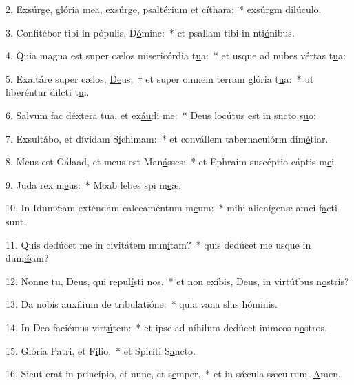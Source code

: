 2. Exsúrge, glória mea, exsúrge, psaltérium et c\uline{í}thara:~* exsúrgm dil\uline{ú}culo.\par 
3. Confitébor tibi in pópulis, D\uline{ó}mine:~* et psallam tibi in nti\uline{ó}nibus.\par 
4. Quia magna est super cælos misericórdia t\uline{u}a:~* et usque ad nubes vértas t\uline{u}a:\par 
5. Exaltáre super cælos, \uline{De}us,~† et super omnem terram glória t\uline{u}a:~* ut liberéntur dilcti t\uline{u}i.\par 
6. Salvum fac déxtera tua, et ex\uline{áu}di me:~* Deus locútus est in sncto s\uline{u}o:\par 
7. Exsultábo, et dívidam S\uline{í}chimam:~* et convállem tabernaculórm dim\uline{é}tiar.\par 
8. Meus est Gálaad, et meus est Man\uline{á}sses:~* et Ephraim suscéptio cáptis m\uline{e}i.\par 
9. Juda rex m\uline{e}us:~* Moab lebes spi m\uline{e}æ.\par 
10. In Idumǽam exténdam calceaméntum m\uline{e}um:~* mihi alienígenæ amci f\uline{a}cti sunt.\par 
11. Quis dedúcet me in civitátem mun\uline{í}tam?~* quis dedúcet me usque in dum\uline{ǽ}am?\par 
12. Nonne tu, Deus, qui repul\uline{í}sti nos,~* et non exíbis, Deus, in virtútbus n\uline{o}stris?\par 
13. Da nobis auxílium de tribulati\uline{ó}ne:~* quia vana slus h\uline{ó}minis.\par 
14. In Deo faciémus virt\uline{ú}tem:~* et ipse ad níhilum dedúcet inimcos n\uline{o}stros.\par 
15. Glória Patri, et F\uline{í}lio,~* et Spiríti S\uline{a}ncto.\par 
16. Sicut erat in princípio, et nunc, et s\uline{e}mper,~* et in sǽcula sæculrum. \uline{A}men.\par 
